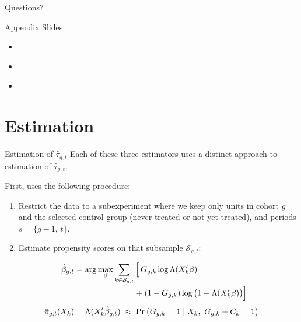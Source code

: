 \documentclass[11pt]{beamer}
\begin{document}
\begin{frame}{Questions?}
    
\end{frame}

\appendix

\begin{frame}[label=appendix]{Appendix Slides}
    \begin{itemize}
        \item \hyperlink{est_cs}{}
        \item \hyperlink{est_sa}{}
        \item \hyperlink{stack_decomp}{}
    \end{itemize}
\end{frame}


\section{Estimation}

\begin{frame}[label=est_cs]{Estimation of $\hat{\tau}_{g,t}$}
    Each of these three estimators uses a distinct approach to estimation of $\hat{\tau}_{g,t}$.

    \vspace{2mm}

    First, \cite{callaway2021difference} uses the following procedure:
    \begin{enumerate}
        \item Restrict the data to a subexperiment where we keep only units in
              cohort $g$ and the selected control group (never-treated or
              not-yet-treated), and periods $s = \{g-1,\, t\}$.
        \item Estimate propensity scores on that subsample $\mathcal{S}_{g,t}$:
    \end{enumerate}

    \vspace{-2mm}
    {\small
    \begin{align*}
      \hat\beta_{g,t}
        &= \arg\max_{\beta} \sum_{k \in \mathcal{S}_{g,t}}
           \Big[\, G_{g,k}\log \Lambda(X_k'\beta) \\[-0.5mm]
        &\hspace{26mm}
           + (1 - G_{g,k}) \log\big(1 - \Lambda(X_k'\beta)\big) \Big] \\[1mm]
      \hat\pi_{g,t}(X_k)
        &= \Lambda(X_k'\hat\beta_{g,t})
           \;\approx\; \Pr\big(G_{g,k} = 1 \mid X_k,\ G_{g,k} + C_k = 1\big)
    \end{align*}
    }
\end{frame}
\end{document}
